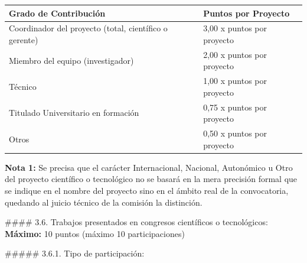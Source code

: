 \documentclass{article}
\begin{document}
\begin{itemize}
\begin{itemize}
\begin{scriptsize}
                  \vspace{0.4cm}
                  \begin{table}[h!]\centering\renewcommand{\arraystretch}{1.3}
                    \begin{tabular}{|p{}|p{}|}\hline
                      Grado de Contribución                                  & Puntos por Proyecto        \\\hline
                      Coordinador del proyecto (total, científico o gerente) & 3,00 x puntos por proyecto \\\hline
                      Miembro del equipo (investigador)                      & 2,00 x puntos por proyecto \\\hline
                      Técnico                                                & 1,00 x puntos por proyecto \\\hline
                      Titulado Universitario en formación                    & 0,75 x puntos por proyecto \\\hline
                      Otros                                                  & 0,50 x puntos por proyecto \\\hline
                    \end{tabular}\end{table}
                  \vspace{0.4cm}

                  \textbf{Nota 1:} Se precisa que el carácter Internacional, Nacional, Autonómico u Otro del proyecto científico o tecnológico no se basará en la mera precisión formal que se indique en el nombre del proyecto sino en el ámbito real de la convocatoria, quedando al juicio técnico de la comisión la distinción.

                  \#\#\#\# 3.6. Trabajos presentados en congresos científicos o tecnológicos:
                  \textbf{Máximo:} 10 puntos
                  (máximo 10 participaciones)

                  \#\#\#\#\# 3.6.1. Tipo de participación:


\end{scriptsize}
\end{itemize}
\end{itemize}
\end{document}
